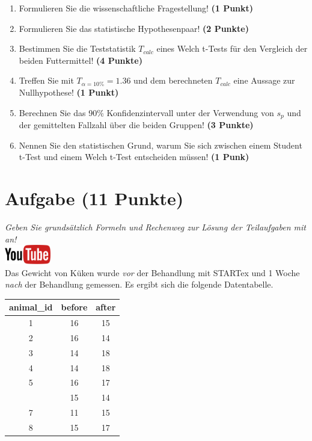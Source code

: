 \documentclass[a4paper, 9pt]{scrartcl}\usepackage[]{graphicx}\usepackage[]{xcolor}
\begin{document}
\begin{enumerate}
  \item Formulieren Sie die wissenschaftliche Fragestellung! \textbf{(1 Punkt)}
  \item Formulieren Sie das statistische Hypothesenpaar! \textbf{(2
      Punkte)}
  \item Bestimmen Sie die Teststatistik $T_{calc}$ eines Welch t-Tests f{\"u}r den
  Vergleich der beiden Futtermittel! \textbf{(4 Punkte)}
\item Treffen Sie mit $T_{\alpha = 10\%} = 1.36$ und dem berechneten $T_{calc}$ eine Aussage
  zur Nullhypothese! \textbf{(1 Punkt)}
\item Berechnen Sie das 90\% Konfidenzintervall unter der
  Verwendung von $s_p$ und der gemittelten Fallzahl {\"u}ber die beiden Gruppen! \textbf{(3 Punkte)}
\item Nennen Sie den statistischen Grund, warum Sie sich zwischen einem Student t-Test und einem
  Welch t-Test entscheiden m{\"u}ssen! \textbf{(1 Punk)}
\end{enumerate} 
\clearpage

\section{Aufgabe \hfill (11 Punkte)}

\textit{Geben Sie grunds{\"a}tzlich Formeln und Rechenweg zur L{\"o}sung der
  Teilaufgaben mit an!} \\[1Ex]

\hfill\href{https://youtu.be/QR90zyn0Iz8}{\includegraphics[width =
  2cm]{img/youtube}}\\[1Ex]


Das Gewicht von K{\"u}ken wurde \textit{vor} der Behandlung mit STARTex und 1
Woche \textit{nach} der Behandlung gemessen. Es ergibt sich die folgende
Datentabelle.

\begin{table}[!h]
\centering
\begin{tabular}{ccc}
\toprule
animal\_id & before & after\\
\midrule
1 & 16 & 15\\
2 & 16 & 14\\
3 & 14 & 18\\
4 & 14 & 18\\
5 & 16 & 17\\
\addlinespace
6 & 15 & 14\\
7 & 11 & 15\\
8 & 15 & 17\\
\bottomrule
\end{tabular}
\end{table}
\end{document}
